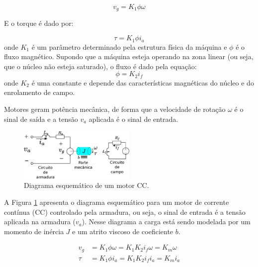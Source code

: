\begin{equation}
    v_g = K_{1}\phi\omega
\end{equation}

E o torque é dado por:

\begin{equation}
    \tau = K_{1} \phi i_a 
\end{equation}onde $K_1$ é um parâmetro determinado pela estrutura física da máquina e $\phi$ é o fluxo magnético. Supondo que a máquina esteja operando na zona linear (ou seja, que o núcleo não esteja saturado), o fluxo é dado pela equação:
\begin{equation}
    \phi = K_{2}i_f
\end{equation}onde $K_2$ é uma constante e depende das características magnéticas do núcleo e do enrolamento de campo.

Motores geram potência mecânica, de forma que a velocidade de rotação $\omega$ é o sinal de saída e a tensão $v_a$ aplicada é o sinal de entrada. 

\begin{figure}[H]
    \centering
    \includegraphics[width=0.5\textwidth]{figuras/ilustracoes/esquematico_motor_dc.eps}
    \caption{Diagrama esquemático de um motor CC.}
    \label{fig:modelo_motor_dc}
\end{figure}


A Figura \ref{fig:modelo_motor_dc} apresenta o diagrama esquemático para um motor de corrente contínua (CC) controlado pela armadura, ou seja, o sinal de entrada é a tensão aplicada na armadura ($v_a$). Nesse diagrama a carga está sendo modelada por um momento de inércia $J$ e um atrito viscoso de coeficiente $b$.

\begin{align*}
    v_g &= K_{1}\phi\omega= K_{1}K_{2}i_{f}\omega = K_{m}\omega\\
    \tau &= K_{1} \phi i_{a}= K_{1} K_{2}i_{f} i_{a} = K_{m}i_{a}
\end{align*}

